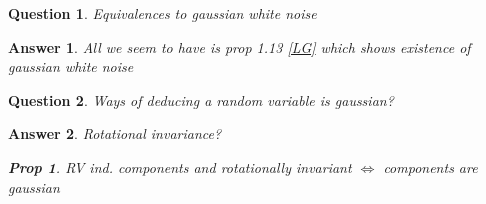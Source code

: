 \documentclass[11pt]{article}
\newtheorem{prop}{Prop}
\newtheorem{quest}{Question}
\newtheorem{ans}{Answer}
\begin{document}
\begin{quest}
	Equivalences to gaussian white noise
\end{quest}

\begin{ans}
	All we seem to have is prop 1.13 \ref{LG} which shows existence of gaussian white noise
\end{ans}

\begin{quest}
	Ways of deducing a random variable is gaussian?
\end{quest}

\begin{ans}
	Rotational invariance?
	\begin{prop}
		RV ind. components and rotationally invariant $\iff$ components are gaussian
	\end{prop}
\end{ans}


\end{document}
